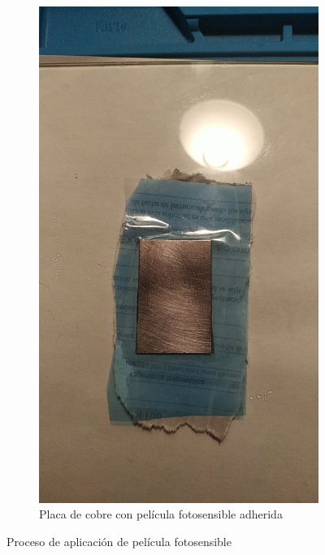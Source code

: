 \begin{figure}[!htb]
\begin{subfigure}[b]{.475\textwidth}
        \includegraphics[width=1\textwidth, trim={0 350 0 550}, clip]{tfg/figuras/06_prototipado/pelicula/placa_con_film_pegado.png}
        \caption{Placa de cobre con película fotosensible adherida}
        \label{fig:tfg:06:placa_con_film_pegado}
    \end{subfigure}%
    \caption{Proceso de aplicación de película fotosensible}
    \label{fig:tfg:06:aplicacion_pelicula}
\end{figure}

